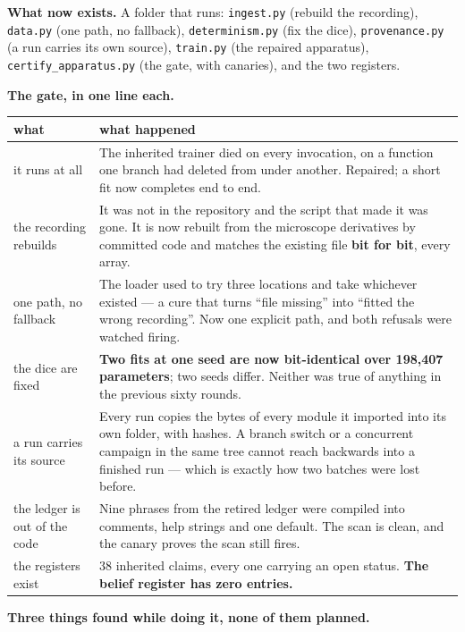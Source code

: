 \documentclass[11pt,a4paper]{article}
\newcommand{\code}[1]{\texttt{#1}}
\begin{document}
\textbf{What now exists.} A folder that runs: \code{ingest.py} (rebuild the recording),
\code{data.py} (one path, no fallback), \code{determinism.py} (fix the dice),
\code{provenance.py} (a run carries its own source), \code{train.py} (the repaired apparatus),
\code{certify\_apparatus.py} (the gate, with canaries), and the two registers.

\textbf{The gate, in one line each.}

\footnotesize
\begin{tabular}{@{}l p{11.0cm}@{}}
\toprule
\textbf{what} & \textbf{what happened}\\
\midrule
it runs at all & The inherited trainer died on every invocation, on a function one branch had
deleted from under another. Repaired; a short fit now completes end to end.\\
the recording rebuilds & It was not in the repository and the script that made it was gone. It is
now rebuilt from the microscope derivatives by committed code and matches the existing file
\textbf{bit for bit}, every array.\\
one path, no fallback & The loader used to try three locations and take whichever existed --- a
cure that turns ``file missing'' into ``fitted the wrong recording''. Now one explicit path, and
both refusals were watched firing.\\
the dice are fixed & \textbf{Two fits at one seed are now bit-identical over 198{,}407
parameters}; two seeds differ. Neither was true of anything in the previous sixty rounds.\\
a run carries its source & Every run copies the bytes of every module it imported into its own
folder, with hashes. A branch switch or a concurrent campaign in the same tree cannot reach
backwards into a finished run --- which is exactly how two batches were lost before.\\
the ledger is out of the code & Nine phrases from the retired ledger were compiled into comments,
help strings and one default. The scan is clean, and the canary proves the scan still fires.\\
the registers exist & 38 inherited claims, every one carrying an open status. \textbf{The belief
register has zero entries.}\\
\bottomrule
\end{tabular}
\normalsize

\textbf{Three things found while doing it, none of them planned.}
\end{document}
